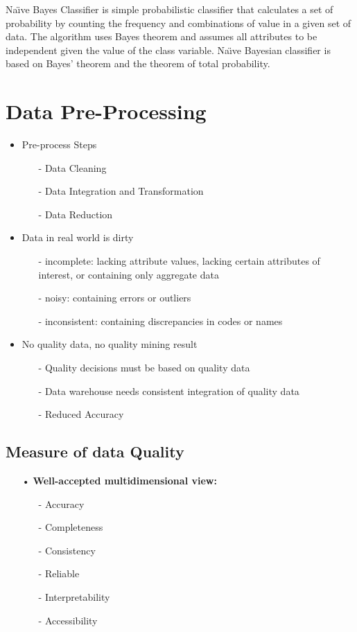 \par
Na\"{\i}ve Bayes Classifier is simple probabilistic classifier that calculates a set of probability by counting the frequency and combinations of value in a given set of data. The algorithm uses Bayes theorem and assumes all attributes to be independent given the value  of  the  class  variable. Na\"{\i}ve Bayesian classifier is based on Bayes’ theorem and the theorem of total probability. 


\section{Data Pre-Processing}\label{sec:obj}
\begin{itemize}
\item Pre-process Steps
	\begin{itemize}
	\item[-] Data Cleaning
	\item[-] Data Integration and Transformation
	\item[-] Data Reduction
	\end{itemize}
\item Data in real world is dirty 
	\begin{itemize}
	\item[-]incomplete: lacking attribute values, lacking certain attributes of interest, or containing only aggregate data
	\item[-] noisy: containing errors or outliers
	\item[-] inconsistent: containing discrepancies in codes or names
    
	\end{itemize}
\item No quality data, no quality mining result
	\begin{itemize}
	\item[-] Quality decisions must be based on quality data
	\item[-] Data warehouse needs consistent integration of quality data
	\item[-] Reduced Accuracy
	\end{itemize}
\end{itemize}     
    
    
    
\subsection{Measure of data Quality}
    \begin{itemize}
    \item[•] \textbf{Well-accepted multidimensional view:}
    \begin{itemize}
    \item[-] Accuracy
    \item[-] Completeness
    \item[-] Consistency
    \item[-] Reliable
    \item[-] Interpretability         
    \item[-] Accessibility
    \end{itemize}     
    \end{itemize}

